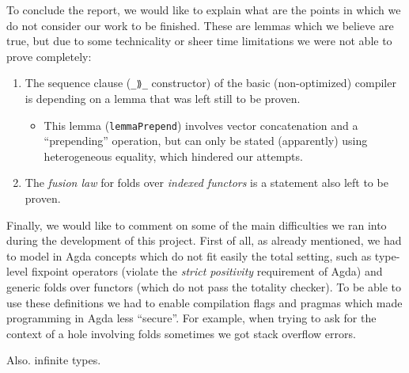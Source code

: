 \documentclass[a4paper]{article}
\begin{document}
        To conclude the report, we would like to explain what are the points in which we do not consider our work
        to be finished. These are lemmas which we believe are true, but due to some technicality or sheer
        time limitations we were not able to prove completely:

        \begin{enumerate}
            \item The sequence clause (\texttt{\_⟫\_} constructor) of the basic (non-optimized) compiler
                is depending on a lemma that was left still to be proven.
                \begin{itemize}
                    \item This lemma (\texttt{lemmaPrepend}) involves vector concatenation and a ``prepending'' operation,
                        but can only be stated (apparently) using heterogeneous equality, which hindered our attempts.
                \end{itemize}

            \item The \emph{fusion law} for folds over \emph{indexed functors} is a statement also left
                to be proven.
        \end{enumerate}

        Finally, we would like to comment on some of the main difficulties we ran into during the
        development of this project. First of all, as already mentioned, we had to model in Agda concepts which
        do not fit easily the total setting, such as type-level fixpoint operators (violate the
        \emph{strict positivity} requirement of Agda) and generic folds over functors (which do not pass
        the totality checker). To be able to use these definitions we had to enable compilation flags and pragmas
        which made programming in Agda less ``secure''. For example, when trying to ask for the context of
        a hole involving folds sometimes we got stack overflow errors.

        Also. infinite types.



    
    
\end{document}
